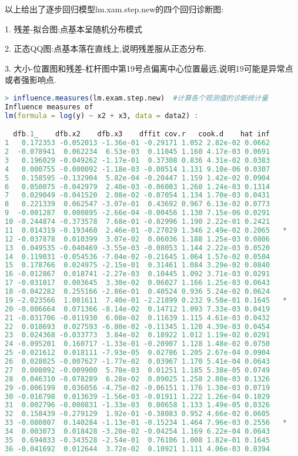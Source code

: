 \documentclass[11pt,a4paper,oneside]{book}
\begin{document}
以上给出了逐步回归模型lm.xam.step.new的四个回归诊断图:

1. 残差-拟合图:点基本呈随机分布模式

2. 正态QQ图:点基本落在直线上,说明残差服从正态分布.

3. 大小-位置图和残差-杠杆图中第19号点偏离中心位置最远,说明19可能是异常点或者强影响点.
\begin{lstlisting}[language=r]
> influence.measures(lm.exam.step.new)  #计算各个观测值的诊断统计量
Influence measures of
lm(formula = log(y) ~ x2 + x3, data = data2) :

  dfb.1_    dfb.x2    dfb.x3    dffit cov.r   cook.d    hat inf
1   0.172353 -0.052013 -1.36e-01 -0.29171 1.052 2.82e-02 0.0662    
2  -0.078941  0.062234  6.53e-03  0.11045 1.160 4.17e-03 0.0691    
3   0.196029 -0.049262 -1.17e-01  0.37308 0.836 4.31e-02 0.0383    
4   0.000755 -0.000092 -1.18e-03 -0.00514 1.131 9.10e-06 0.0307    
5   0.158595 -0.132904  5.82e-04 -0.20447 1.159 1.42e-02 0.0904    
6   0.050075 -0.042979  2.40e-03 -0.06003 1.260 1.24e-03 0.1314    
7   0.029049 -0.041520  2.08e-02 -0.07054 1.134 1.70e-03 0.0431    
8   0.221339  0.062547 -3.07e-01  0.43692 0.967 6.13e-02 0.0773    
9  -0.001287  0.000895 -2.66e-04 -0.00456 1.130 7.15e-06 0.0291    
10 -0.244874 -0.373578  7.68e-01 -0.82996 1.190 2.22e-01 0.2421    
11  0.014319 -0.193460  2.46e-01 -0.27029 1.346 2.49e-02 0.2065   *
12 -0.037878  0.010399  3.07e-02  0.06036 1.188 1.25e-03 0.0806    
13  0.049535 -0.040469 -3.55e-03 -0.08053 1.144 2.22e-03 0.0520    
14  0.119031 -0.054536 -7.04e-02 -0.21645 1.064 1.57e-02 0.0504    
15  0.178766  0.024975 -2.15e-01  0.31461 1.084 3.29e-02 0.0840    
16 -0.012867  0.018741 -2.27e-03  0.10445 1.092 3.71e-03 0.0291    
17 -0.031017  0.003645  3.30e-02  0.06027 1.166 1.25e-03 0.0643    
18 -0.042282  0.255166 -2.86e-01  0.40524 0.936 5.24e-02 0.0624    
19 -2.023566  1.001611  7.40e-01 -2.21899 0.232 9.50e-01 0.1645   *
20 -0.006664  0.071366 -8.14e-02  0.14712 1.093 7.33e-03 0.0419    
21 -0.031706 -0.011930  6.08e-02  0.11639 1.115 4.61e-03 0.0432    
22  0.018693  0.027593 -6.80e-02 -0.11345 1.120 4.39e-03 0.0454    
23  0.024368 -0.033773  3.84e-02  0.18922 1.012 1.19e-02 0.0291    
24 -0.095201  0.160717 -1.33e-01 -0.20907 1.128 1.48e-02 0.0750    
25 -0.021612  0.018111 -7.93e-05  0.02786 1.205 2.67e-04 0.0904    
26  0.028025 -0.007627 -1.77e-02  0.03967 1.170 5.41e-04 0.0643    
27  0.008092 -0.009900  5.70e-03  0.01251 1.185 5.38e-05 0.0749    
28  0.046310 -0.078289  6.28e-02  0.09025 1.258 2.80e-03 0.1326    
29 -0.006199  0.036056 -4.75e-02 -0.06151 1.176 1.30e-03 0.0719    
30 -0.016798  0.013639 -1.56e-03 -0.01911 1.222 1.26e-04 0.1029    
31  0.002796 -0.000831 -1.33e-03  0.00658 1.133 1.49e-05 0.0326    
32  0.158439 -0.279129  1.92e-01 -0.38083 0.952 4.66e-02 0.0605    
33 -0.080807  0.140284 -1.13e-01 -0.15234 1.464 7.96e-03 0.2556   *
34  0.003073  0.018428 -3.20e-02 -0.04254 1.169 6.22e-04 0.0643    
35  0.694033 -0.343528 -2.54e-01  0.76106 1.008 1.82e-01 0.1645    
36 -0.041692  0.012644  3.72e-02  0.10921 1.111 4.06e-03 0.0394    
\end{lstlisting}
\end{document}
